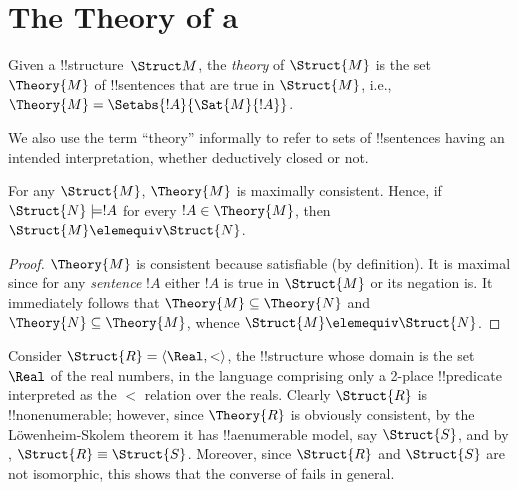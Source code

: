 \documentclass[../../include/open-logic-section]{subfiles}
\begin{document}
\section{The Theory of a }

\begin{defn}
  Given a !!{structure}~$\Struct M$, the \emph{theory} of
  $\Struct{M}$ is the set $\Theory{M}$ of !!{sentence}s
  that are true in $\Struct{M}$, i.e., $\Theory{M} =
  \Setabs{!A}{\Sat{M}{!A}}$.
\end{defn}

We also use the term ``theory'' informally to refer to sets
of !!{sentence}s having an intended interpretation, whether deductively
closed or not.

\begin{prop}
  For any $\Struct{M}$,  $\Theory{M}$ is maximally
  consistent. Hence, if $\Struct{N} \models !A$ for every $!A
  \in \Theory{M}$, then $\Struct{M} \elemequiv
  \Struct{N}$.
\end{prop}

\begin{proof}
  $\Theory{M}$ is consistent because satisfiable (by definition). It
  is maximal since for any \emph{sentence} $!A$ either $!A$ is true in
  $\Struct{M}$ or its negation is. It immediately follows that
  $\Theory{M} \subseteq \Theory{N}$ and $\Theory{N} \subseteq
  \Theory{M}$, whence $\Struct{M} \elemequiv \Struct{N}$.
\end{proof}

\begin{rem}
  Consider $\Struct{R} = \langle\Real, <\rangle$, the !!{structure}
  whose domain is the set $\Real$ of the real numbers, in the language
  comprising only a 2-place !!{predicate} interpreted as the $<$
  relation over the reals. Clearly $\Struct{R}$ is !!{nonenumerable};
  however, since $\Theory{R}$ is obviously consistent, by the
  L\"owenheim-Skolem theorem it has !!a{enumerable} model, say
  $\Struct{S}$, and by , $\Struct{R}
  \equiv \Struct{S}$. Moreover, since $\Struct{R}$ and $\Struct{S}$
  are not isomorphic, this shows that the converse of
   fails in general.
\end{rem}
\end{document}
